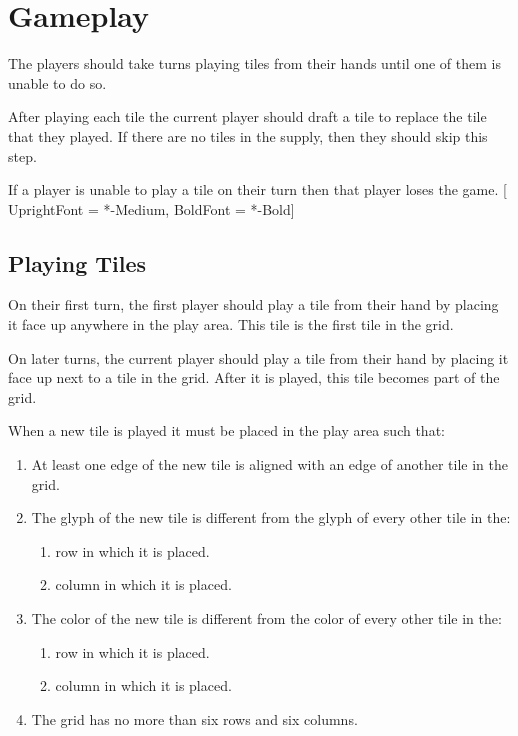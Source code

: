 \section{Gameplay}
The players should take turns playing tiles from their hands until one of them is unable to do so.

After playing each tile the current player should draft a tile to replace the tile that they played. If there are no tiles in the supply, then they should skip this step.

If a player is unable to play a tile on their turn then that player loses the game.
\setmainfont{Quicksand}[
	UprightFont = *-Medium,
	BoldFont = *-Bold]
\raggedright

\subsection{Playing Tiles}
On their first turn, the first player should play a tile from their hand by placing it face up anywhere in the play area. This tile is the first tile in the grid.

On later turns, the current player should play a tile from their hand by placing it face up next to a tile in the grid. After it is played, this tile becomes part of the grid.

When a new tile is played it must be placed in the play area such that:
\begin{enumerate}
  \item At least one edge of the new tile is aligned with an edge of another tile in the grid.
  \item The glyph of the new tile is different from the glyph of every other tile in the:
  \begin{enumerate}
  	\item row in which it is placed.
    	\item column in which it is placed.
  \end{enumerate}
  \item The color of the new tile is different from the color of every other tile in the:
  \begin{enumerate}
  	\item row in which it is placed.
    \item column in which it is placed.
  \end{enumerate}
  \item The grid has no more than six rows and six columns.
\end{enumerate}
